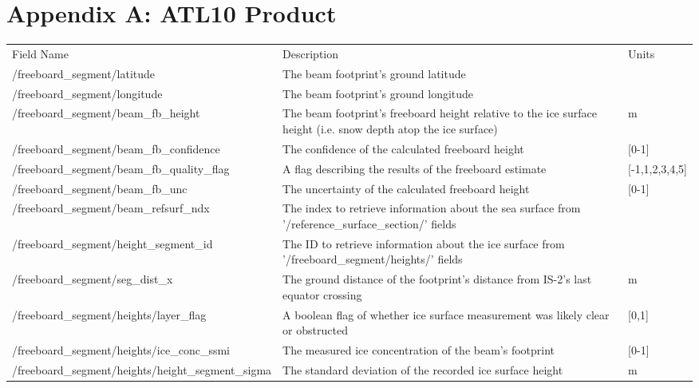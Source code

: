   \chapter{Appendix A: ATL10 Product}\label{appendix:A}
\tiny
  \begin{table}[htbp]
   \begin{adjustwidth}{-4em}{-4em}
   \centering
  \begin{tabularx}{1.33\textwidth} {|l|X|l|}
   \hline
   Field Name & Description & Units\\ 
\hhline{|=|=|=|}
   /freeboard\_segment/latitude & The beam footprint's ground latitude & \\ 
   \hline
   /freeboard\_segment/longitude & The beam footprint's ground longitude & \\ 
   \hline
   /freeboard\_segment/beam\_fb\_height & The beam footprint's freeboard height relative to the ice surface height (i.e. snow depth atop the ice surface) & m \\ 
   \hline
   /freeboard\_segment/beam\_fb\_confidence & The confidence of the calculated freeboard height & [0-1]\\ 
   \hline
   /freeboard\_segment/beam\_fb\_quality\_flag & A flag describing the results of the freeboard estimate & [-1,1,2,3,4,5] \\ 
   \hline
   /freeboard\_segment/beam\_fb\_unc & The uncertainty of the calculated freeboard height & [0-1]\\ 
   \hline
   /freeboard\_segment/beam\_refsurf\_ndx & The index to retrieve information about the sea surface from '/reference\_surface\_section/' fields & \\ 
   \hline
   /freeboard\_segment/height\_segment\_id & The ID to retrieve information about the ice surface from '/freeboard\_segment/heights/' fields & \\ 
   \hline
   /freeboard\_segment/seg\_dist\_x & The ground distance of the footprint's distance from IS-2's last equator crossing & m\\ 
\hhline{|=|=|=|}
   /freeboard\_segment/heights/layer\_flag & A boolean flag of whether ice surface measurement was likely clear or obstructed & [0,1]\\ 
   \hline
   /freeboard\_segment/heights/ice\_conc\_ssmi & The measured ice concentration of the beam's footprint & [0-1] \\ 
   \hline
   /freeboard\_segment/heights/height\_segment\_sigma & The standard deviation of the recorded ice surface height & m\\ 

\end{tabularx}
\end{adjustwidth}
\end{table}
